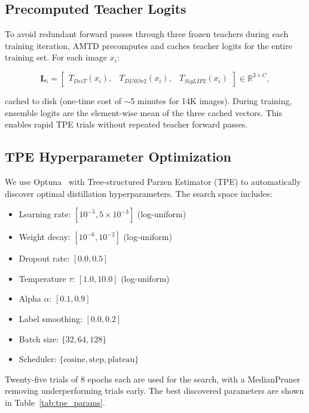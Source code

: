 \documentclass[journal]{IEEEtran}
\begin{document}
\subsection{Precomputed Teacher Logits}

To avoid redundant forward passes through three frozen teachers during each training iteration,
AMTD precomputes and caches teacher logits for the entire training set. For each image $x_i$:

\begin{equation}
    \mathbf{L}_i = \begin{bmatrix} T_{DeiT}(x_i), & T_{DINOv2}(x_i), & T_{SigLIP2}(x_i) \end{bmatrix} \in \mathbb{R}^{3 \times C},
\end{equation}

cached to disk (one-time cost of $\sim$5 minutes for 14K images). During training, ensemble
logits are the element-wise mean of the three cached vectors. This enables rapid TPE trials
without repeated teacher forward passes.

\subsection{TPE Hyperparameter Optimization}

We use Optuna~\cite{akiba2019optuna} with Tree-structured Parzen Estimator (TPE) to
automatically discover optimal distillation hyperparameters. The search space includes:

\begin{itemize}
    \item Learning rate: $[10^{-5}, 5 \times 10^{-3}]$ (log-uniform)
    \item Weight decay: $[10^{-6}, 10^{-2}]$ (log-uniform)
    \item Dropout rate: $[0.0, 0.5]$
    \item Temperature $\tau$: $[1.0, 10.0]$ (log-uniform)
    \item Alpha $\alpha$: $[0.1, 0.9]$
    \item Label smoothing: $[0.0, 0.2]$
    \item Batch size: $\{32, 64, 128\}$
    \item Scheduler: $\{\text{cosine}, \text{step}, \text{plateau}\}$
\end{itemize}

Twenty-five trials of 8 epochs each are used for the search, with a MedianPruner removing
underperforming trials early. The best discovered parameters are shown in Table~\ref{tab:tpe_params}.
\end{document}
